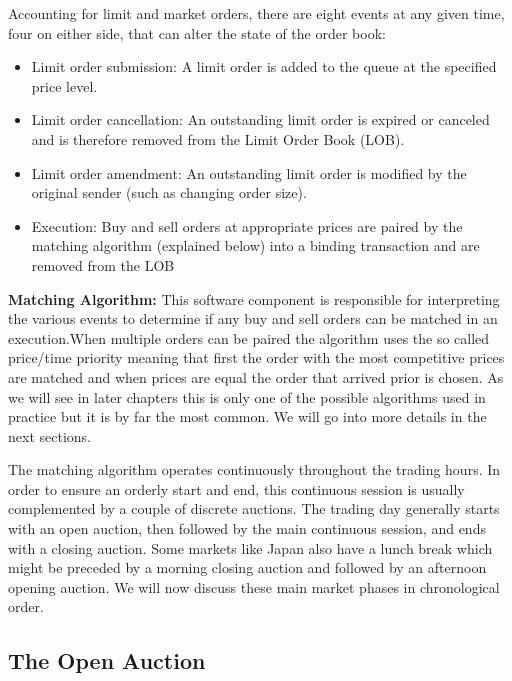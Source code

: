 Accounting for limit and market orders, there are eight events at any given time, four on either side, that can alter the state of the order book:
	\begin{itemize}
	\item Limit order submission: A limit order is added to the queue at the specified price level.
	\item Limit order cancellation: An outstanding limit order is expired or canceled and is therefore removed from the Limit Order Book (LOB).
	\item Limit order amendment: An outstanding limit order is modified by the original sender (such as changing order size).
	\item Execution: Buy and sell orders at appropriate prices are paired by the matching algorithm (explained below) into a binding transaction and are removed from the LOB
	\end{itemize}


\noindent\textbf{Matching Algorithm:} This software component is responsible for interpreting the various events to determine if any buy and sell orders can be matched in an execution.When multiple orders can be paired the algorithm uses the so called price/time priority meaning that first the order with the most competitive prices are matched and when prices are equal the order that arrived prior is chosen. As we will see in later chapters this is only one of the possible algorithms used in practice but it is by far the most common. We will go into more details in the next sections.


The matching algorithm operates continuously throughout the trading hours. In order to ensure an orderly start and end, this continuous session is usually complemented by a couple of discrete auctions. The trading day generally starts with an open auction, then followed by the main continuous session, and ends with a closing auction. Some markets like Japan also have a lunch break which might be preceded by a morning closing auction and followed by an afternoon opening auction. We will now discuss these main market phases in chronological order. 



\subsection{The Open Auction} \label{in:imbalance}

